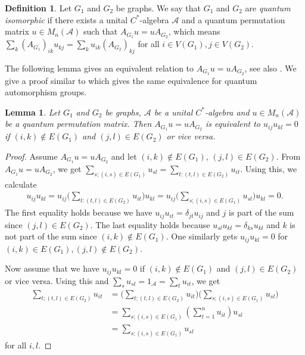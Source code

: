 \documentclass[11pt]{article}
\newtheorem{lemm}[theo]{Lemma}
\theoremstyle{definition}
\newtheorem{defi}[theo]{Definition}
\numberwithin{equation}{section}
\begin{document}
\begin{defi}
Let $G_1$ and $G_2$ be graphs. We say that $G_1$ and $G_2$ are \emph{quantum isomorphic} if there exists a unital $C^*$-algebra $\mathcal{A}$ and a quantum permutation matrix $u\in M_n(\mathcal{A})$ such that $A_{G_1}u=uA_{G_2}$, which means $\sum_k(A_{G_1})_{ik}u_{kj}=\sum_k u_{ik}(A_{G_2})_{kj}$ for all $i\in V(G_1), j \in V(G_2)$.
\end{defi}

The following lemma gives an equivalent relation to $A_{G_1}u=uA_{G_2}$, see also \cite[Theorem 2.2 and Theorem 2.5]{LMR}. We give a proof similar to \cite[Proposition 2.1.3]{Sthesis} which gives the same equivalence for quantum automorphism groups. 

\begin{lemm}\label{lemprod0}
Let $G_1$ and $G_2$ be graphs, $\mathcal{A}$ be a unital $C^*$-algebra and $u\in M_n(\mathcal{A})$ be a quantum permutation matrix. Then $A_{G_1}u=uA_{G_2}$ is equivalent to $u_{ij}u_{kl}=0$ if $(i,k)\notin E(G_1)$ and $(j,l)\in E(G_2)$ or vice versa.
\end{lemm}

\begin{proof}
Assume $A_{G_1}u=uA_{G_2}$ and let $(i,k)\notin E(G_1)$, $(j,l)\in E(G_2)$. From $A_{G_1}u=uA_{G_2}$, we get $\sum_{s;(i,s)\in E(G_1)}u_{sl}=\sum_{t:(t,l)\in E(G_2)} u_{it}$. Using this, we calculate
\begin{align*}
    u_{ij}u_{kl}= u_{ij}\bigg(\sum_{t:(t,l)\in E(G_2)} u_{it}\bigg)u_{kl}=u_{ij}\bigg(\sum_{s;(i,s)\in E(G_1)}u_{sl}\bigg)u_{kl}=0.
\end{align*}
The first equality holds because we have $u_{ij}u_{it}=\delta_{jt}u_{ij}$ and $j$ is part of the sum since $(j,l)\in E(G_2)$. The last equality holds because $u_{sl}u_{kl}=\delta_{ks}u_{kl}$ and $k$ is not part of the sum since $(i,k)\notin E(G_1)$. One similarly gets $u_{ij}u_{kl}=0$ for $(i,k)\in E(G_1), (j,l)\notin E(G_2)$. 

Now assume that we have $u_{ij}u_{kl}=0$ if $(i,k)\notin E(G_1)$ and $(j,l)\in E(G_2)$ or vice versa. Using this and $\sum_s u_{sl}=1_{\mathcal{A}}=\sum_t u_{it}$, we get
\begin{align*}
    \sum_{t;(t,l)\in E(G_2)}u_{it}&=\bigg(\sum_{t;(t,l)\in E(G_2)}u_{it}\bigg)\bigg(\sum_{s;(i,s)\in E(G_1)}u_{sl}\bigg)\\
    &=\sum_{s;(i,s)\in E(G_1)}\left(\sum_{t=1}^nu_{it}\right)u_{sl}\\
    &=\sum_{s;(i,s)\in E(G_1)}u_{sl}
\end{align*}
for all $i,l$. 
\end{proof}
\end{document}
